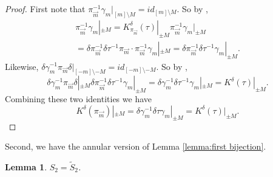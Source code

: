 \documentclass[11pt]{amsart}
\newtheorem{lemma}[theorem]{Lemma}
\theoremstyle{definition}
\numberwithin{theorem}{section}
\newcommand{\sM}{{\scriptscriptstyle M}}
\newcommand{\vm}{{\vec{m}}}
\newcommand{\id}{\mathit{id}}
\begin{document}
\begin{proof}
First note that $\pi_\vm^{-1} \gamma_m|_{[m] \setminus M} =
\id_{[m] \setminus M}$. So by \cite[Lemma 6]{mst},
\begin{multline*}
\pi_\vm^{-1} \gamma_m |_{\pm \sM} = K^\delta_{\pi_\vm}(\tau) |_{\pm \sM} \pi_\vm^{-1} \gamma_m |_{\pm \sM} \\
\mbox{}= \delta \pi_\vm^{-1} \delta \tau^{-1} \pi_\vm \cdot \pi_\vm^{-1} \gamma_m |_{\pm \sM} =
\delta \pi_\vm^{-1} \delta \tau^{-1} \gamma_m|_{\pm \sM}.
\end{multline*}
Likewise, $\delta \gamma_m^{-1}\pi_\vm \delta|_{[-m]
  \setminus -M} = \id_{[-m] \setminus -M}$. So by
\cite[Lemma 6]{mst},
\[
\delta \gamma_m^{-1} \pi_\vm \delta|_{\pm\sM} \delta \pi_\vm^{-1} \delta \tau^{-1} \gamma_m|_{\pm \sM}
= \delta \gamma_m^{-1} \delta \tau^{-1} \gamma_m |_{\pm \sM} = K^\delta(\tau)|_{\pm \sM}.
\]
Combining these two identities we have 
\[
K^\delta(\pi_\vm)|_{\pm \sM} = \delta \gamma_m^{-1} \delta \tau \gamma_m |_{\pm \sM} = K^\delta(\tau)|_{\pm \sM}.
\]
\end{proof}
Second, we have the annular version of Lemma
\ref{lemma:first bijection}.

\begin{lemma}\label{lemma:second bijection}
$S_2 = \tilde{S}_2$.
\end{lemma}
\end{document}
